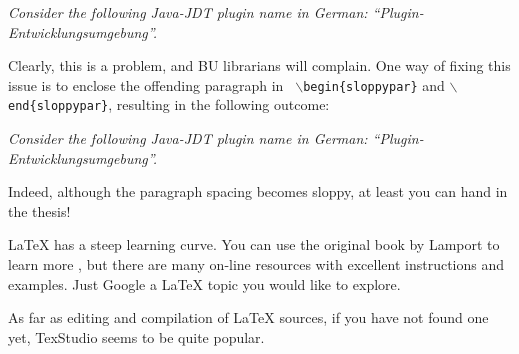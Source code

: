 \bigskip

{\it Consider the following Java-JDT plugin name in German: "`Plugin-Entwicklungsumgebung"'.}

\bigskip

Clearly, this is a problem, and BU librarians will complain. One way of fixing
this issue is to enclose the offending paragraph in {\tt
	$\backslash$begin\{sloppypar\}} and {\tt $\backslash$end\{sloppypar\}},
resulting in the following outcome:

\bigskip

\begin{sloppypar}
	{\it Consider the following Java-JDT plugin name in German:
		"`Plugin-Entwicklungsumgebung"'.}
\end{sloppypar}

\bigskip

Indeed, although the paragraph spacing becomes sloppy, at least you can hand in
the thesis!


LaTeX has a steep learning curve. You can use the original book by Lamport to
learn more \cite{lamport1985:latex}, but there are many on-line resources with
excellent instructions and examples. Just Google a LaTeX topic you would like to
explore.

As far as editing and compilation of LaTeX sources, if you have not found one
yet, TexStudio seems to be quite popular.